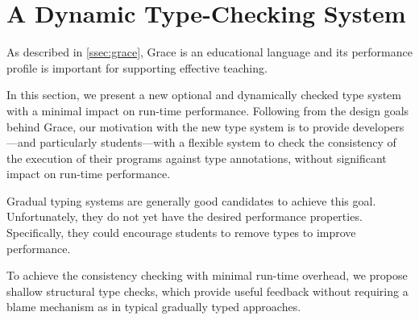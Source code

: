 
\section{A Dynamic Type-Checking System}
\label{sec:method}




As described in \cref{ssec:grace},
Grace is an educational language and its performance profile
is important for supporting effective teaching. 

In this section,
we present a new optional and dynamically checked type system
with a minimal impact on run-time performance.
Following from the design goals behind Grace,
our motivation with the new type system
is to provide developers---and particularly students---with a flexible system 
to check the consistency of the execution of their programs
against type annotations,
without significant impact on run-time performance.

Gradual typing systems are generally good candidates to achieve this goal.
Unfortunately, they do not yet have the desired performance properties\citep{Takikawa2016}.
Specifically, they could encourage students to remove types
to improve performance.



To achieve the consistency checking with minimal run-time overhead,
we propose shallow structural type checks,
which provide useful feedback without requiring a blame mechanism
as in typical gradually typed approaches.


